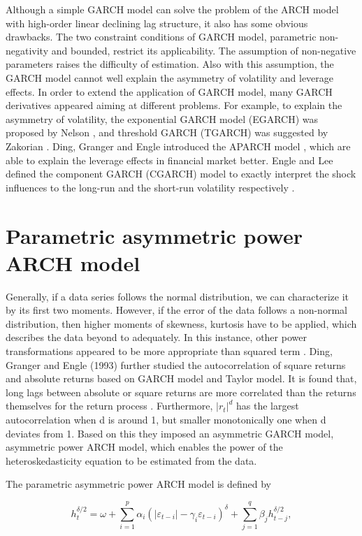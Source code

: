 Although a simple GARCH model can solve the problem of the ARCH model with high-order linear declining lag structure, it also has some obvious drawbacks.  The two constraint conditions of GARCH model, parametric non-negativity and bounded, restrict its applicability. The assumption of non-negative parameters raises the difficulty of estimation. Also with this assumption, the GARCH model cannot well explain the asymmetry of volatility and leverage effects. In order to extend the application of GARCH model, many GARCH derivatives appeared aiming at different problems. For example, to explain the asymmetry of volatility, the exponential GARCH model (EGARCH) was proposed by Nelson \cite{Nelson1991}, and threshold GARCH (TGARCH) was suggested by Zakorian \cite{Zakoian1994}. Ding, Granger and Engle introduced the APARCH model \citep{Ding1993}, which are able to explain the leverage effects in financial market better. Engle and Lee defined the component GARCH (CGARCH) model to exactly interpret the shock influences to the long-run and the short-run volatility respectively \cite{0-19-829683-5}.

\section{Parametric asymmetric power ARCH model}

Generally, if a data series follows the normal distribution, we can characterize it by its first two moments. However, if the error of the data follows a non-normal distribution, then higher moments of skewness, kurtosis have to be applied, which describes the data beyond to adequately. In this instance, other power transformations appeared to be more appropriate than squared term \cite{McKenzie1999}. Ding, Granger and Engle (1993) further studied the autocorrelation of square returns and absolute returns based on GARCH model and Taylor model. It is found that, long lags between absolute or square returns are more correlated than the returns themselves for the return process \cite{stephen1986modelling}. Furthermore, $|r_{t}|^{d}$ has the largest autocorrelation when d is around 1, but smaller monotonically one when d deviates from 1. Based on this they imposed an asymmetric GARCH model, asymmetric power ARCH model, which enables the power of the heteroskedasticity equation to be estimated from the data.


The parametric asymmetric power ARCH model is defined by

\begin{equation}
h_{t}^{\delta/2} = \omega + \sum_{i=1}^{p} \alpha_{i}(|\varepsilon_{t-i}|-\gamma_{i}\varepsilon_{t-i})^{\delta} + \sum_{j=1}^{q}\beta_{j}h_{t-j}^{\delta/2},
\end{equation}

